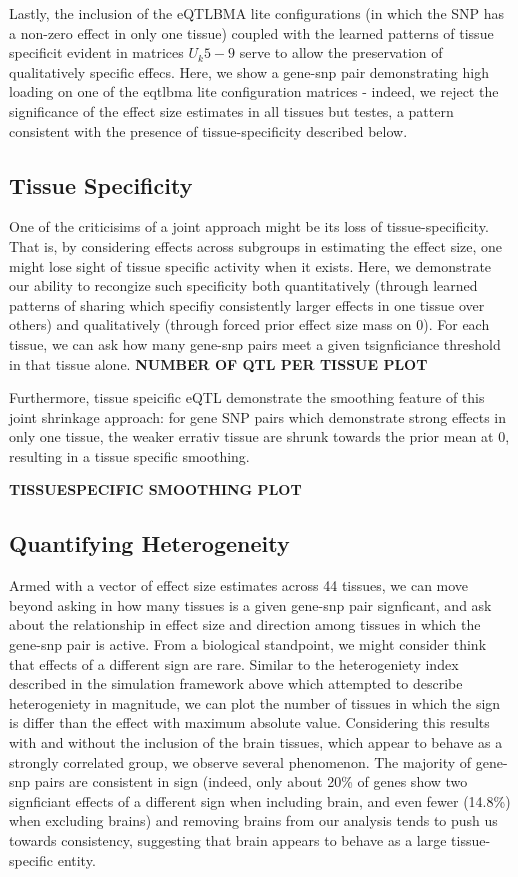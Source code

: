 Lastly, the inclusion of the eQTLBMA lite configurations (in which the SNP has a non-zero effect in only one tissue) coupled with the learned patterns of tissue specificit evident in matrices $U_{k}5-9$ serve to allow the preservation of qualitatively specific effecs. Here, we show a gene-snp pair demonstrating high loading on one of the eqtlbma lite configuration matrices - indeed, we reject the significance of the effect size estimates in all tissues but testes, a pattern consistent with the presence of tissue-specificity described below.


\subsection{Tissue Specificity}

One of the criticisims of a joint approach might be its loss of tissue-specificity. That is, by considering effects across subgroups in estimating the effect size, one might lose sight of tissue specific activity when it exists. Here, we demonstrate our ability to recongize such specificity both quantitatively (through learned patterns of sharing which specifiy consistently larger effects in one tissue over others) and qualitatively (through forced prior effect size mass on 0).  For each tissue, we can ask how many gene-snp pairs meet a given tsignficiance threshold in that tissue alone. 
\textbf{NUMBER OF QTL PER TISSUE PLOT}

Furthermore, tissue speicific eQTL demonstrate the smoothing feature of this joint shrinkage approach: for gene SNP pairs which demonstrate strong effects in only one tissue, the weaker errativ tissue are shrunk towards the prior mean at 0, resulting in a tissue specific smoothing.

\textbf{TISSUESPECIFIC SMOOTHING PLOT}

\subsection{Quantifying Heterogeneity}


Armed with a vector of effect size estimates across 44 tissues, we can move beyond asking in how many tissues is a given gene-snp pair signficant, and ask about the relationship in effect size and direction among tissues in which the gene-snp pair is active. From a biological standpoint, we might consider think that effects of a different sign are rare. Similar to the heterogeniety index described in the simulation framework above which attempted to describe heterogeniety in magnitude, we can plot the number of tissues in which the sign is differ than the effect with maximum absolute value. Considering this results with and without the inclusion of the brain tissues, which appear to behave as a strongly correlated group, we observe several phenomenon. The majority of gene-snp pairs are consistent in sign (indeed, only about 20\% of genes show two signficiant effects of a different sign when including brain, and even fewer (14.8\%) when excluding brains) and removing brains from our analysis tends to push us towards consistency, suggesting that brain appears to behave as a large tissue-specific entity.

